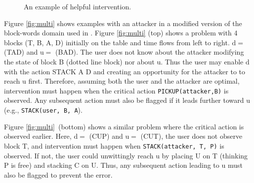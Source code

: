 \documentclass[letterpaper]{article}
\theoremstyle{plain}
\begin{document}
\begin{figure}[b]
         \vspace{0.1mm}
        \caption{An example of helpful intervention. }
        \label{fig:single}
\end{figure}

Figure \ref{fig:multi} shows examples with an attacker in a modified version of the block-words domain used in \cite{ramirez2009plan}.
Figure \ref{fig:multi} (top) shows a problem with 4 blocks (T, B, A, D) initially on the table and time flows from left to right. 
$\mathrm{d}=$ (TAD) and $\mathrm{u}=$ (BAD).
The user does not know about the attacker modifying the state of block B (dotted line block) nor about $\mathrm{u}$.
Thus the user may enable $\mathrm{d}$ with the action STACK A D and creating an opportunity for the attacker to to reach $\mathrm{u}$ first. 
Therefore, assuming both the user and the attacker are optimal, intervention must happen when the critical action \texttt{PICKUP(attacker,B)} is observed. 
Any subsequent action must also be flagged if it leads further toward $\mathrm{u}$  (e.g., \texttt{STACK(user, B, A}). 

Figure \ref{fig:multi}~(bottom) shows a similar problem where the critical action is observed earlier.
Here, $\mathrm{d}= $ (CUP) and $\mathrm{u}= $ (CUT), the user does not observe block T, 
and intervention must happen when \texttt{STACK(attacker, T, P)} is observed. If not, the user could unwittingly reach $\mathrm{u}$ by placing U on T (thinking P is free) and stacking C on U. 
Thus, any subsequent action leading  to $\mathrm{u}$ must also be flagged to prevent the error.
\end{document}
